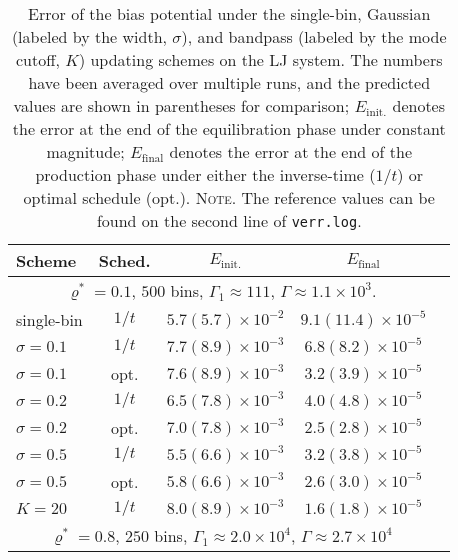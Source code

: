 \documentclass[reprint, superscriptaddress, floatfix]{revtex4-1}
\newcommand{\note}[1]{{\color{DarkGreen}\footnotesize \textsc{Note.} #1}}
\newcommand{\Err}{E}
\begin{document}
\begin{table}[h]\footnotesize
  \caption{\label{tab:lj_error}
    Error of the bias potential under
    the single-bin,
    Gaussian (labeled by the width, $\sigma$),
    and bandpass (labeled by the mode cutoff, $K$)
    updating schemes
    on the LJ system.
    The numbers have been averaged over multiple runs,
    and the predicted values are shown in parentheses for comparison;
    $\Err_\mathrm{init.}$
    denotes the error
    at the end of the equilibration phase under constant magnitude;
    $\Err_\mathrm{final}$
    denotes the error at the end of the production phase under
    either the inverse-time ($1/t$) or optimal schedule (opt.).
    \note{The reference values can be found
    on the second line of \texttt{verr.log}.}%
  }
  \setlength{\tabcolsep}{2pt}
  \renewcommand\arraystretch{1.4}
  \begin{tabular} { l c c c c }
    \hline
    Scheme & Sched. &
    $\Err_\mathrm{init.}$ &
    $\Err_\mathrm{final}$
    \\
    \hline
    \multicolumn{4}{c}{
      $\varrho^* = 0.1$,
      $500$ bins,
      $\Gamma_1 \approx 111$,
      $\Gamma \approx 1.1\times10^3$.
    } \\
    \hline
    single-bin & $1/t$
    & $5.7(5.7)\times10^{-2}$
    & $9.1(11.4)\times10^{-5}$
    \\
    $\sigma=0.1$ & $1/t$
    & $7.7(8.9)\times10^{-3}$
    & $6.8(8.2)\times10^{-5}$
    \\
    $\sigma=0.1$ & opt.
    & $7.6(8.9)\times10^{-3}$
    & $3.2(3.9)\times10^{-5}$
    \\
    $\sigma=0.2$ & $1/t$
    & $6.5(7.8)\times10^{-3}$
    & $4.0(4.8)\times10^{-5}$
    \\
    $\sigma=0.2$ & opt.
    & $7.0(7.8)\times10^{-3}$
    & $2.5(2.8)\times10^{-5}$
    \\
    $\sigma=0.5$ & $1/t$
    & $5.5(6.6)\times10^{-3}$
    & $3.2(3.8)\times10^{-5}$
    \\
    $\sigma=0.5$ & opt.
    & $5.8(6.6)\times10^{-3}$
    & $2.6(3.0)\times10^{-5}$
    \\
    $K=20$ & $1/t$
    & $8.0(8.9)\times10^{-3}$
    & $1.6(1.8)\times10^{-5}$
    \\
    \hline
    \multicolumn{4}{c}{
      $\varrho^* = 0.8$,
      $250$ bins,
      $\Gamma_1 \approx 2.0\times10^4$,
      $\Gamma \approx 2.7\times10^4$
    } \\

\end{tabular}
\end{table}
\end{document}

